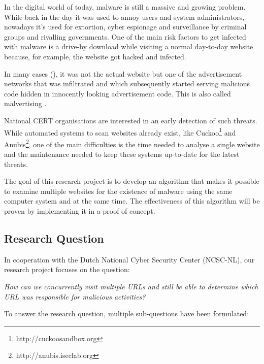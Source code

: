 In the digital world of today, malware is still a massive and growing problem. While back in the day it was used to annoy users and system administrators, nowadays it's used for extortion, cyber espionage and surveillance by criminal groups and rivalling governments. One of the main risk factors to get infected with malware is a drive-by download while visiting a normal day-to-day website because, for example, the website got hacked and infected. 

In many cases (\cite{proofpoint,foxittelegraaf,foxityahoo}), it was not the actual website but one of the advertisement networks that was infiltrated and which subsequently started serving malicious code hidden in innocently looking advertisement code. This is also called malvertising \cite{Li2012}.

National CERT organisations are interested in an early detection of such threats. While automated systems to scan websites already exist, like Cuckoo\footnote{http://cuckoosandbox.org} and Anubis\footnote{http://anubis.iseclab.org}, one of the main difficulties is the time needed to analyse a single website and the maintenance needed to keep these systems up-to-date for the latest threats.

The goal of this research project is to develop an algorithm that makes it possible to examine multiple websites for the existence of malware using the same computer system and at the same time. The effectiveness of this algorithm will be proven by implementing it in a proof of concept.



\subsection{Research Question}

In cooperation with the Dutch National Cyber Security Center (NCSC-NL), our research project focuses on the question:

\textit{How can we concurrently visit multiple URLs and still be able to determine which URL was responsible for malicious activities?}

To answer the research question, multiple sub-questions have been formulated:

